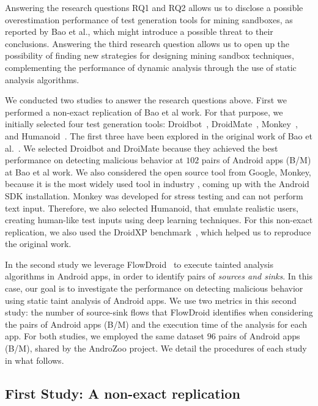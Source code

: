 Answering the research questions RQ1 and RQ2 allows us to disclose a possible overestimation performance of test generation tools for mining sandboxes,
as reported by Bao et al., which might introduce a possible threat to their conclusions. Answering the third research question
allows us to open up the possibility of finding new strategies for designing mining sandbox techniques, complementing the performance of
dynamic analysis through the use of static analysis algorithms.

We conducted two studies to answer the research questions above. First we performed a non-exact replication of Bao et al work.
For that purpose, we initially selected four test generation tools: Droidbot~\cite{DBLP:conf/icse/LiYGC17},
DroidMate~\cite{DBLP:conf/icse/JamrozikZ16}, Monkey~\cite{Monkey}, and Humanoid~\cite{DBLP:conf/kbse/LiY0C19}. The first three have
been explored in the original work of Bao et al.~\cite{DBLP:conf/icse/JamrozikZ16}. We selected Droidbot and DroiMate because they achieved
the best performance on detecting malicious behavior at $102$ pairs of Android apps (B/M) at Bao et al work. We also considered the open source tool from Google, Monkey, because it is the most widely used tool in industry \cite{DBLP:conf/sigsoft/ZengLZXDLYX16}, coming up with the Android SDK installation. Monkey was developed for stress testing and can not perform text input. Therefore, we also selected Humanoid, that emulate realistic users, creating human-like test inputs using deep learning techniques.
For this non-exact replication, we also used the DroidXP benchmark~\cite{DBLP:conf/scam/CostaMCMVBC20},
which helped us to reproduce the original work.

In the second study we leverage FlowDroid~\cite{DBLP:conf/pldi/ArztRFBBKTOM14} to execute
tainted analysis algorithms in Android apps, in order to identify pairs of \emph{sources and sinks}. In this case,
our goal is to investigate the performance on detecting malicious
behavior using static taint analysis of Android apps. We use two metrics in this second study: the number
of source-sink flows that FlowDroid identifies when considering the pairs of Android apps (B/M) and the
execution time of the analysis for each app.
For both studies, we employed the same dataset $96$ pairs of Android apps (B/M),
shared by the AndroZoo \cite{DBLP:conf/msr/AllixBKT16} project. We detail the procedures of each study in what follows.

\subsection{First Study: A non-exact replication}

